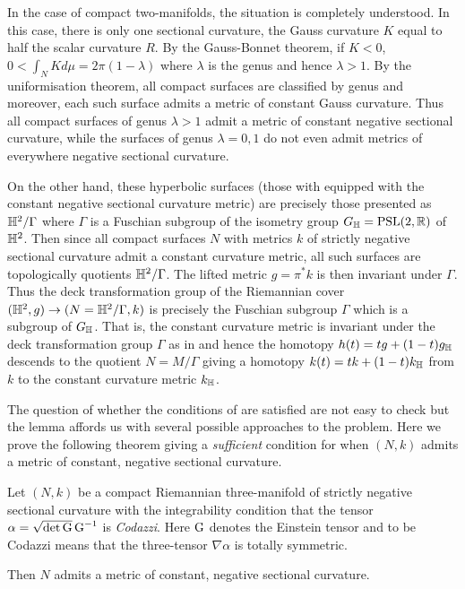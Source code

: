 \documentclass[a4paper, 12pt]{amsart}
\begin{document}
\begin{rem}
In the case of compact two-manifolds, the situation is completely understood. In this case, there is only one sectional curvature, the Gauss curvature \(K\) equal to half the scalar curvature \(R\). By the Gauss-Bonnet theorem, if \(K < 0\), \(0 < \int_N K d\mu = 2\pi(1-\lambda)\) where \(\lambda\) is the genus and hence \(\lambda > 1\). By the uniformisation theorem, all compact surfaces are classified by genus and moreover, each such surface admits a metric of constant Gauss curvature. Thus all compact surfaces of genus \(\lambda > 1\) admit a metric of constant negative sectional curvature, while the surfaces of genus \(\lambda = 0, 1\) do not even admit metrics of everywhere negative sectional curvature.

On the other hand, these hyperbolic surfaces (those with equipped with the constant negative sectional curvature metric) are precisely those presented as \(\mathbb{H}^2/\Gamma\) where \(\Gamma\) is a Fuschian subgroup of the isometry group \(G_{\mathbb{H}} = \text{PSL}(2, \mathbb{R})\) of \(\mathbb{H}^2\). Then since all compact surfaces \(N\) with metrics \(k\) of strictly negative sectional curvature admit a constant curvature metric, all such surfaces are topologically quotients \(\mathbb{H}^2/\Gamma\). The lifted metric \(g = \pi^{\ast} k\) is then invariant under \(\Gamma\). Thus the deck transformation group of the Riemannian cover \((\mathbb{H}^2, g) \to (N = \mathbb{H}^2/\Gamma, k)\) is precisely the Fuschian subgroup \(\Gamma\) which is a subgroup of \(G_{\mathbb{H}}\). That is, the constant curvature metric is invariant under the deck transformation group \(\Gamma\) as in  and hence the homotopy \(h(t) = t g + (1-t)g_{\mathbb{H}}\) descends to the quotient \(N = M/\Gamma\) giving a homotopy \(k(t) = t k + (1-t)k_{\mathbb{H}}\) from \(k\) to the constant curvature metric \(k_{\mathbb{H}}\).
\end{rem}

The question of whether the conditions of  are satisfied are not easy to check but the lemma affords us with several possible approaches to the problem. Here we prove the following theorem giving a \emph{sufficient} condition for when \((N, k)\) admits a metric of constant, negative sectional curvature.

\begin{thm}
\label{thm:intg_const_curv}
Let \((N, k)\) be a compact Riemannian three-manifold of strictly negative sectional curvature with the integrability condition that the tensor \(\alpha = \sqrt{\det \operatorname{G}} \operatorname{G}^{-1}\) is \emph{Codazzi}. Here \(\operatorname{G}\) denotes the Einstein tensor and to be Codazzi means that the three-tensor \(\nabla \alpha\) is totally symmetric.

Then \(N\) admits a metric of constant, negative sectional curvature.
\end{thm}
\end{document}
